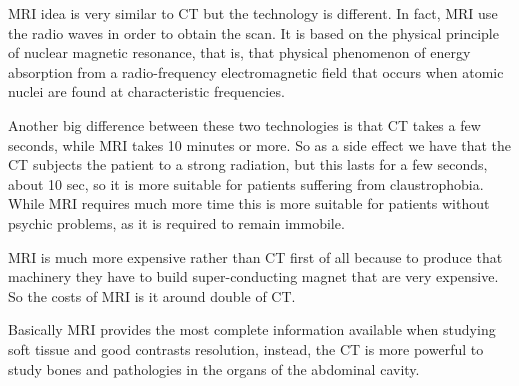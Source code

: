 \documentclass[a4 paper,12pt]{article}
\begin{document}
        MRI idea is very similar to CT but the technology is different. In fact, MRI use the radio waves in order to obtain the scan. 
        It is based on the physical principle of nuclear magnetic resonance, that is, that physical phenomenon of energy absorption from a radio-frequency electromagnetic field that occurs when atomic nuclei are found at characteristic frequencies.
        
        Another big difference between these two technologies is that CT takes a few seconds, while MRI takes 10 minutes or more. So as a side effect we have that the CT subjects the patient to a strong radiation, but this lasts for a few seconds, about 10 sec, so it is more suitable for patients suffering from claustrophobia. While MRI requires much more time this is more suitable for patients without psychic problems, as it is required to remain immobile.
        
        MRI is much more expensive rather than CT first of all because to produce that machinery they have to build super-conducting magnet that are very expensive.
        So the costs of MRI is it around double of CT.
        
        Basically MRI provides the most complete information available when studying soft tissue and good contrasts resolution, instead, the CT is more powerful to study bones and pathologies in the organs of the abdominal cavity.
        
\end{document}
